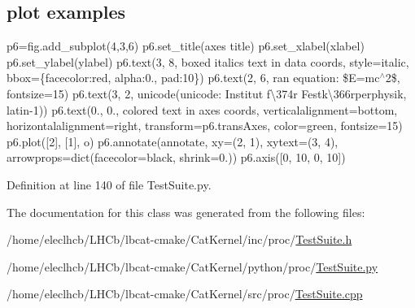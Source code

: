 \subsection*{plot examples}

p6=fig.\+add\+\_\+subplot(4,3,6) p6.\+set\+\_\+title(\textquotesingle{}axes title\textquotesingle{}) p6.\+set\+\_\+xlabel(\textquotesingle{}xlabel\textquotesingle{}) p6.\+set\+\_\+ylabel(\textquotesingle{}ylabel\textquotesingle{}) p6.\+text(3, 8, \textquotesingle{}boxed italics text in data coords\textquotesingle{}, style=\textquotesingle{}italic\textquotesingle{}, bbox=\{\textquotesingle{}facecolor\textquotesingle{}\+:\textquotesingle{}red\textquotesingle{}, \textquotesingle{}alpha\textquotesingle{}\+:0., \textquotesingle{}pad\textquotesingle{}\+:10\}) p6.\+text(2, 6, r\textquotesingle{}an equation\+: \$E=mc$^\wedge$2\$\textquotesingle{}, fontsize=15) p6.\+text(3, 2, unicode(\textquotesingle{}unicode\+: Institut f\textbackslash{}374r Festk\textbackslash{}366rperphysik\textquotesingle{}, \textquotesingle{}latin-\/1\textquotesingle{})) p6.\+text(0., 0., \textquotesingle{}colored text in axes coords\textquotesingle{}, verticalalignment=\textquotesingle{}bottom\textquotesingle{}, horizontalalignment=\textquotesingle{}right\textquotesingle{}, transform=p6.\+trans\+Axes, color=\textquotesingle{}green\textquotesingle{}, fontsize=15) p6.\+plot(\mbox{[}2\mbox{]}, \mbox{[}1\mbox{]}, \textquotesingle{}o\textquotesingle{}) p6.\+annotate(\textquotesingle{}annotate\textquotesingle{}, xy=(2, 1), xytext=(3, 4), arrowprops=dict(facecolor=\textquotesingle{}black\textquotesingle{}, shrink=0.)) p6.\+axis(\mbox{[}0, 10, 0, 10\mbox{]}) 



Definition at line 140 of file Test\+Suite.\+py.



The documentation for this class was generated from the following files\+:\begin{DoxyCompactItemize}
\item 
/home/eleclhcb/\+L\+H\+Cb/lbcat-\/cmake/\+Cat\+Kernel/inc/proc/\hyperlink{TestSuite_8h}{Test\+Suite.\+h}\item 
/home/eleclhcb/\+L\+H\+Cb/lbcat-\/cmake/\+Cat\+Kernel/python/proc/\hyperlink{TestSuite_8py}{Test\+Suite.\+py}\item 
/home/eleclhcb/\+L\+H\+Cb/lbcat-\/cmake/\+Cat\+Kernel/src/proc/\hyperlink{TestSuite_8cpp}{Test\+Suite.\+cpp}\end{DoxyCompactItemize}
